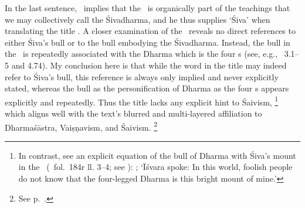 \noindent
In the last sentence, \Sanderson\ implies that the
\VSS\ is organically part of the teachings that we
may collectively call the Śivadharma, and he
thus supplies `Śiva' when translating the title \Vss.
A closer examination of the \VSS\ 
reveals no direct references to either Śiva's bull or
to the bull embodying the Śivadharma. Instead, the bull
in the \VSS\ is repeatedly associated with the Dharma which
is the four \asrama s (see, e.g., \VSS\ 3.1--5 and 4.74).
My conclusion here is that while the word  in the
title may indeed refer to Śiva's bull, 
this reference is always only implied and never explicitly stated,
whereas the bull as the personification of Dharma as the four
\asrama s appears explicitly and repeatedly. Thus
the title lacks any explicit hint to Śaivism,%
	\footnote{In contrast, see an explicit equation of the bull
	of Dharma with Śiva's mount in the \UUMS\
					(\msCa\ fol.~184r ll. 3--4; see
					):
		;
		    `Īśvara spoke: In this world, foolish people do not know that
		    the four-legged Dharma is this bright mount of mine.'}
which aligns well with the text's blurred and multi-layered
affiliation to Dharmaśāstra, Vaiṣṇavism, and Śaivism.%
		 \footnote{See p.~\pageref{structure}.}




